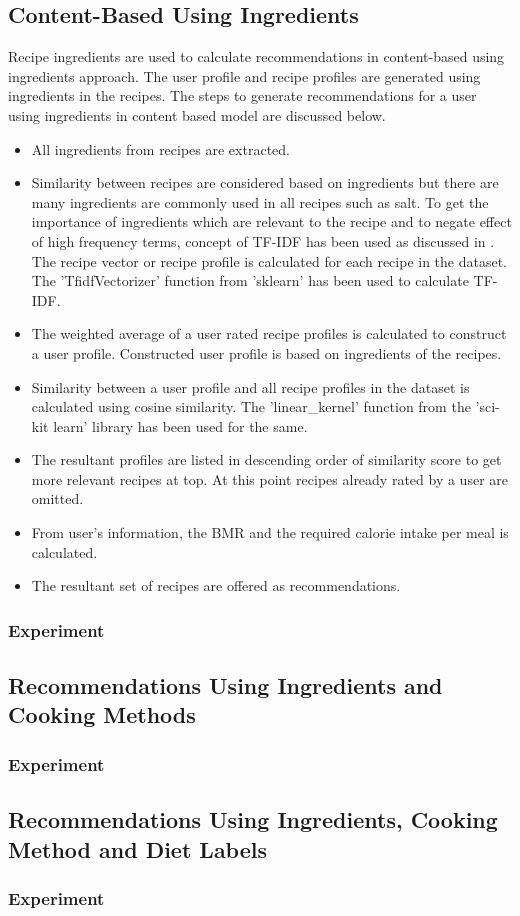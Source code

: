 \subsection{Content-Based Using Ingredients}
Recipe ingredients are used to calculate recommendations in content-based using ingredients approach. The user profile and recipe profiles are generated using ingredients in the recipes. The steps to generate recommendations for a user using ingredients in content based model are discussed below.
\begin{itemize}
\item All ingredients from recipes are extracted. 
\item Similarity between recipes are considered based on ingredients but there are many ingredients are commonly used in all recipes such as salt. To get the importance of ingredients which are relevant to the recipe and to negate effect of high frequency terms, concept of TF-IDF has been used as discussed in . The recipe vector or recipe profile is calculated for each recipe in the dataset. The 'TfidfVectorizer' function from 'sklearn' has been used to calculate TF-IDF.
\item The weighted average of a user rated recipe profiles is calculated to construct a user profile. Constructed user profile is based on ingredients of the recipes.  
\item Similarity between a user profile and all recipe profiles in the dataset is calculated using cosine similarity. The 'linear\_kernel' function from the 'sci-kit learn' library has been used for the same. 
\item The resultant profiles are listed in descending order of similarity score to get more relevant recipes at top. At this point recipes already rated by a user are omitted. 
\item From user's information, the BMR and the required calorie intake per meal is calculated. 
\item The resultant set of recipes are offered as recommendations. 
\end{itemize}
\subsubsection{Experiment}
\label{sec:cb_ingred_exp}

\subsection{Recommendations Using Ingredients and Cooking Methods}
\subsubsection{Experiment}
\label{sec:cb_ingred_cook_method_exp}
\subsection{Recommendations Using Ingredients, Cooking Method and Diet Labels}
\subsubsection{Experiment}
\label{sec:cb_ingred_cook_method_diet_label_exp}



